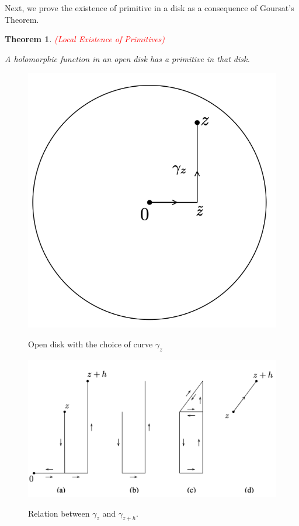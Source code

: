 \documentclass{article}
\newtheorem{theorem}{Theorem}
\begin{document}
Next, we prove the existence of primitive in a disk as a consequence of Goursat's Theorem. 

\begin{theorem} \label{thm:local_prim} \textcolor{red}{(Local Existence of Primitives)}

A holomorphic function in an open disk has a primitive in that disk.
\end{theorem}

\begin{figure}
\centering
\includegraphics[scale=0.3]{local_primitive_1.png} \\
\caption{Open disk with the choice of curve $\gamma_z$} 
\label{fig:local_primitive_1}
\end{figure}

\begin{figure}
\centering
\includegraphics[scale=0.3]{local_primitive_2.png} \\
\caption{Relation between $\gamma_z$ and $\gamma_{z+h}$.} 
\label{fig:local_primitive_2}
\end{figure}
\end{document}

